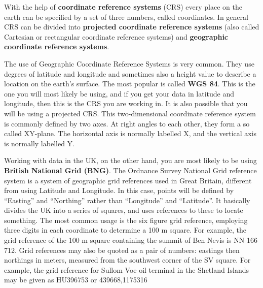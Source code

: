 \documentclass[]{book}
\begin{document}
With the help of \textbf{coordinate reference systems} (CRS) every place on the earth can be specified by a set of three numbers, called coordinates. In general CRS can be divided into \textbf{projected coordinate reference systems} (also called Cartesian or rectangular coordinate reference systems) and \textbf{geographic coordinate reference systems}.

The use of Geographic Coordinate Reference Systems is very common. They use degrees of latitude and longitude and sometimes also a height value to describe a location on the earth's surface. The most popular is called \textbf{WGS 84}. This is the one you will most likely be using, and if you get your data in latitude and longitude, then this is the CRS you are working in. It is also possible that you will be using a projected CRS. This two-dimensional coordinate reference system is commonly defined by two axes. At right angles to each other, they form a so called XY-plane. The horizontal axis is normally labelled X, and the vertical axis is normally labelled Y.

Working with data in the UK, on the other hand, you are most likely to be using \textbf{British National Grid (BNG)}. The Ordnance Survey National Grid reference system is a system of geographic grid references used in Great Britain, different from using Latitude and Longitude. In this case, points will be defined by ``Easting'' and ``Northing'' rather than ``Longitude'' and ``Latitude''. It basically divides the UK into a series of squares, and uses references to these to locate something. The most common usage is the six figure grid reference, employing three digits in each coordinate to determine a 100 m square. For example, the grid reference of the 100 m square containing the summit of Ben Nevis is NN 166 712. Grid references may also be quoted as a pair of numbers: eastings then northings in meters, measured from the southwest corner of the SV square. For example, the grid reference for Sullom Voe oil terminal in the Shetland Islands may be given as HU396753 or 439668,1175316
\end{document}
